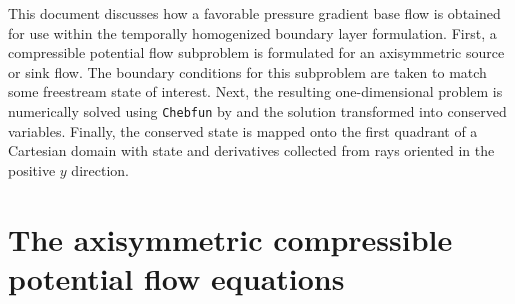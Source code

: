 \documentclass[letterpaper,11pt,nointlimits,reqno]{amsart}
\begin{document}
This document discusses how a favorable pressure gradient base flow is obtained
for use within the temporally homogenized boundary layer formulation.  First, a
compressible potential flow subproblem is formulated for an axisymmetric source
or sink flow.  The boundary conditions for this subproblem are taken to match
some freestream state of interest.  Next, the resulting one-dimensional problem
is numerically solved using \texttt{Chebfun} by \citet{chebfunv4} and the
solution transformed into conserved variables.  Finally, the conserved state is
mapped onto the first quadrant of a Cartesian domain with state and derivatives
collected from rays oriented in the positive $y$ direction.

\section{The axisymmetric compressible potential flow equations}
\end{document}
